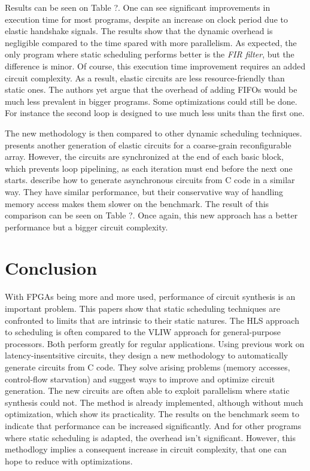\documentclass{article}
\begin{document}
Results can be seen on Table ?. One can see significant improvements in execution time for most programs, despite an increase on clock period due to elastic handshake signals.
The results show that the dynamic overhead is negligible compared to the time spared with more parallelism. As expected, the only program where static scheduling performs better is the \textit{FIR filter}, but the difference is minor.
Of course, this execution time improvement requires an added circuit complexity. As a result, elastic circuits are less resource-friendly than static ones. The authors yet argue that the overhead of adding FIFOs would be much less prevalent in bigger programs. Some optimizations could still be done. For instance the second loop is designed to use much less units than the first one.

The new methodology is then compared to other dynamic scheduling techniques.
\cite{DBLP:conf/fpga/HuangITCW13} presents another generation of elastic circuits for a coarse-grain reconfigurable array. However, the circuits are synchronized at the end of each basic block, which prevents loop pipelining, as each iteration must end before the next one starts.
\cite{DBLP:conf/ispass/BudiuAG05, budiu-tr02} describe how to generate asynchronous circuits from C code in a similar way. They have similar performance, but their conservative way of handling memory access makes them slower on the benchmark.
The result of this comparison can be seen on Table ?. Once again, this new approach has a better performance but a bigger circuit complexity.

\section{Conclusion}
With FPGAs being more and more used, performance of circuit synthesis is an important problem.
This papers show that static scheduling techniques are confronted to limits that are intrinsic to their static natures.
The HLS approach to scheduling is often compared to the VLIW approach for general-purpose processors. Both perform greatly for regular applications.
Using previous work on latency-insentsitive circuits, they design a new methodology to automatically generate circuits from C code.
They solve arising problems (memory accesses, control-flow starvation) and suggest ways to improve and optimize circuit generation.
The new circuits are often able to exploit parallelism where static synthesis could not.
The method is already implemented, although without much optimization, which show its practicality.
The results on the benchmark seem to indicate that performance can be increased significantly. And for other programs where static scheduling is adapted, the overhead isn't significant.
However, this methodlogy implies a consequent increase in circuit complexity, that one can hope to reduce with optimizations. 
\end{document}
